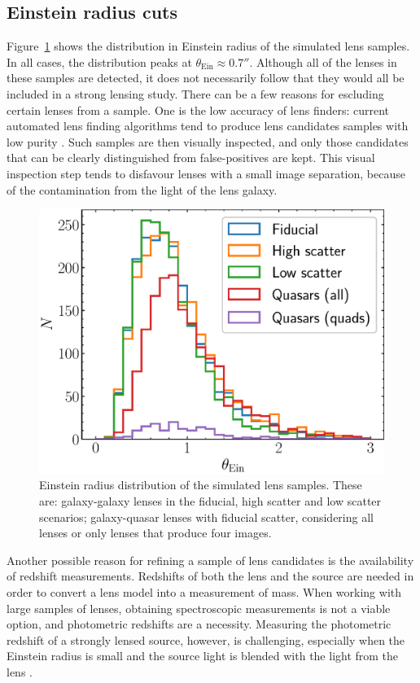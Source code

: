 \documentclass{aa}
\def\tein{\theta_{\mathrm{Ein}}}
\def\Fref#1{Figure~\ref{#1}\xspace}
\begin{document}
\subsection{Einstein radius cuts}

\Fref{fig:teinhist} shows the distribution in Einstein radius of the simulated lens samples.
In all cases, the distribution peaks at $\tein\approx0.7''$.
Although all of the lenses in these samples are detected, it does not necessarily follow that they would all be included in a strong lensing study.
There can be a few reasons for escluding certain lenses from a sample. 
One is the low accuracy of lens finders: current automated lens finding algorithms tend to produce lens candidates samples with low purity \citep[see e.g.][]{Son++18a,Pet++19,Sav++22}. Such samples are then visually inspected, and only those candidates that can be clearly distinguished from false-positives are kept. This visual inspection step tends to disfavour lenses with a small image separation, because of the contamination from the light of the lens galaxy.
\begin{figure}
\includegraphics[width=\columnwidth]{tein_hist.eps}
\caption{
Einstein radius distribution of the simulated lens samples.
These are: galaxy-galaxy lenses in the fiducial, high scatter and low scatter scenarios; galaxy-quasar lenses with fiducial scatter, considering all lenses or only lenses that produce four images.
\label{fig:teinhist}
}
\end{figure}

Another possible reason for refining a sample of lens candidates is the availability of redshift measurements. Redshifts of both the lens and the source are needed in order to convert a lens model into a measurement of mass. When working with large samples of lenses, obtaining spectroscopic measurements is not a viable option, and photometric redshifts are a necessity. Measuring the photometric redshift of a strongly lensed source, however, is challenging, especially when the Einstein radius is small and the source light is blended with the light from the lens \citep{Lan++22}.
\end{document}
